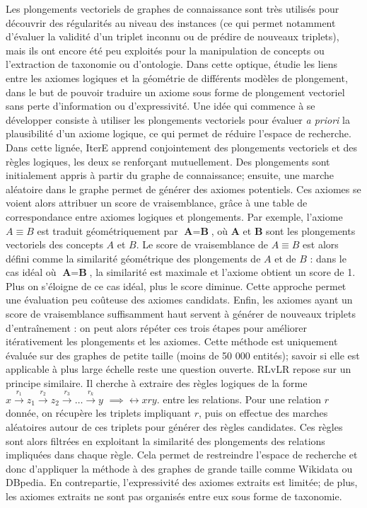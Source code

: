 Les plongements vectoriels de graphes de connaissance sont très utilisés pour découvrir des régularités au niveau des instances (ce qui permet notamment d'évaluer la validité d'un triplet inconnu ou de prédire de nouveaux triplets), mais ils ont encore été peu exploités pour la manipulation de concepts ou l'extraction de taxonomie ou d'ontologie. Dans cette optique, \cite{gutierrez2018knowledge} étudie les liens entre les axiomes logiques et la géométrie de différents modèles de plongement, dans le but de pouvoir traduire un axiome sous forme de plongement vectoriel sans perte d'information ou d'expressivité. Une idée qui commence à se développer consiste à utiliser les plongements vectoriels pour évaluer \textit{a priori} la plausibilité d'un axiome logique, ce qui permet de réduire l'espace de recherche. Dans cette lignée, IterE \cite{zhang2019iteratively} apprend conjointement des plongements vectoriels et des règles logiques, les deux se renforçant mutuellement. Des plongements sont initialement appris à partir du graphe de connaissance; ensuite, une marche aléatoire dans le graphe permet de générer des axiomes potentiels. Ces axiomes se voient alors attribuer un score de vraisemblance, grâce à une table de correspondance entre axiomes logiques et plongements. Par exemple, l'axiome $A \equiv B$ est traduit géométriquement par $\textbf{A} = \textbf{B}$, où $\textbf{A}$ et $\textbf{B}$ sont les plongements vectoriels des concepts $A$ et $B$. Le score de vraisemblance de $A \equiv B$ est alors défini comme la similarité géométrique des plongements de $A$ et de $B$ : dans le cas idéal où $\textbf{A} = \textbf{B}$, la similarité est maximale et l'axiome obtient un score de 1. Plus on s'éloigne de ce cas idéal, plus le score diminue. Cette approche permet une évaluation peu coûteuse des axiomes candidats. Enfin, les axiomes ayant un score de vraisemblance suffisamment haut servent à générer de nouveaux triplets d'entraînement : on peut alors répéter ces trois étapes pour améliorer itérativement les plongements et les axiomes. Cette méthode est uniquement évaluée sur des graphes de petite taille (moins de 50 000 entités); savoir si elle est applicable à plus large échelle reste une question ouverte. RLvLR \cite{omran2018scalable} repose sur un principe similaire. Il cherche à extraire des règles logiques de la forme $x \overset{r_1}{\longrightarrow} z_1 \overset{r_2}{\longrightarrow} z_2  \overset{r_3}{\longrightarrow} \ldots  \overset{r_k}{\longrightarrow} y$ $\implies \rel{x}{r}{y}$. entre les relations. Pour une relation $r$ donnée, on récupère les triplets impliquant $r$, puis on effectue des marches aléatoires autour de ces triplets pour générer des règles candidates. Ces règles sont alors filtrées en exploitant la similarité des plongements des relations impliquées dans chaque règle. Cela permet de restreindre l'espace de recherche et donc d'appliquer la méthode à des graphes de grande taille comme Wikidata ou DBpedia. En contrepartie, l'expressivité des axiomes extraits est limitée; de plus, les axiomes extraits ne sont pas organisés entre eux sous forme de taxonomie.


